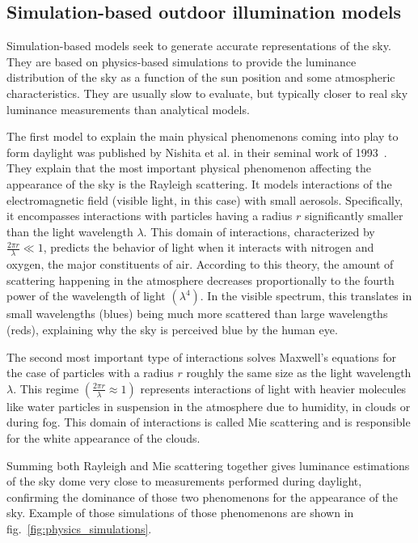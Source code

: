 \subsection{Simulation-based outdoor illumination models}

Simulation-based models seek to generate accurate representations of the sky. They are based on physics-based simulations to provide the luminance distribution of the sky as a function of the sun position and some atmospheric characteristics. They are usually slow to evaluate, but typically closer to real sky luminance measurements than analytical models.

The first model to explain the main physical phenomenons coming into play to form daylight was published by Nishita et al. in their seminal work of 1993~\cite{nishita1993display}. They explain that the most important physical phenomenon affecting the appearance of the sky is the Rayleigh scattering. It models interactions of the electromagnetic field (visible light, in this case) with small aerosols. Specifically, it encompasses interactions with particles having a radius $r$ significantly smaller than the light wavelength $\lambda$. This domain of interactions, characterized by $\frac{2\pi r}{\lambda} \ll 1$, predicts the behavior of light when it interacts with nitrogen and oxygen, the major constituents of air. According to this theory, the amount of scattering happening in the atmosphere decreases proportionally to the fourth power of the wavelength of light $\left(\lambda^4\right)$. In the visible spectrum, this translates in small wavelengths (blues) being much more scattered than large wavelengths (reds), explaining why the sky is perceived blue by the human eye.

The second most important type of interactions solves Maxwell's equations for the case of particles with a radius $r$ roughly the same size as the light wavelength $\lambda$. This regime $\left( \frac{2\pi r}{\lambda} \approx 1 \right)$ represents interactions of light with heavier molecules like water particles in suspension in the atmosphere due to humidity, in clouds or during fog. This domain of interactions is called Mie scattering and is responsible for the white appearance of the clouds.

Summing both Rayleigh and Mie scattering together gives luminance estimations of the sky dome very close to measurements performed during daylight, confirming the dominance of those two phenomenons for the appearance of the sky. Example of those simulations of those phenomenons are shown in fig.~\ref{fig:physics_simulations}.

